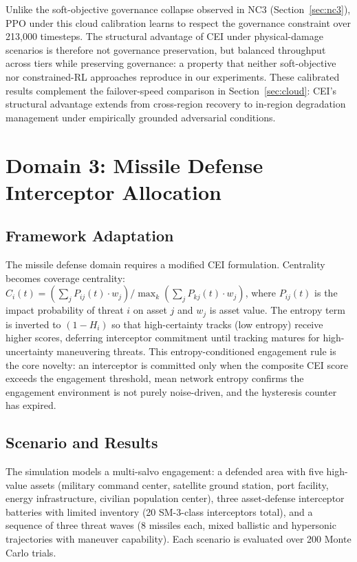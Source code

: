 \documentclass[runningheads]{llncs}
\begin{document}
Unlike the soft-objective governance collapse observed in NC3 (Section~\ref{sec:nc3}), PPO under this cloud calibration learns to respect the governance constraint over 213{,}000 timesteps. The structural advantage of CEI under physical-damage scenarios is therefore not governance preservation, but balanced throughput across tiers while preserving governance: a property that neither soft-objective nor constrained-RL approaches reproduce in our experiments. These calibrated results complement the failover-speed comparison in Section~\ref{sec:cloud}: CEI's structural advantage extends from cross-region recovery to in-region degradation management under empirically grounded adversarial conditions.

\section{Domain 3: Missile Defense Interceptor Allocation}
\label{sec:missile}

\subsection{Framework Adaptation}

The missile defense domain requires a modified CEI formulation. Centrality becomes coverage centrality: $C_i(t) = (\sum_j P_{ij}(t) \cdot w_j) / \max_k(\sum_j P_{kj}(t) \cdot w_j)$, where $P_{ij}(t)$ is the impact probability of threat $i$ on asset $j$ and $w_j$ is asset value. The entropy term is inverted to $(1 - H_i)$ so that high-certainty tracks (low entropy) receive higher scores, deferring interceptor commitment until tracking matures for high-uncertainty maneuvering threats. This entropy-conditioned engagement rule is the core novelty: an interceptor is committed only when the composite CEI score exceeds the engagement threshold, mean network entropy confirms the engagement environment is not purely noise-driven, and the hysteresis counter has expired.

\subsection{Scenario and Results}

The simulation models a multi-salvo engagement: a defended area with five high-value assets (military command center, satellite ground station, port facility, energy infrastructure, civilian population center), three asset-defense interceptor batteries with limited inventory (20 SM-3-class interceptors total), and a sequence of three threat waves (8 missiles each, mixed ballistic and hypersonic trajectories with maneuver capability). Each scenario is evaluated over 200 Monte Carlo trials.
\end{document}
